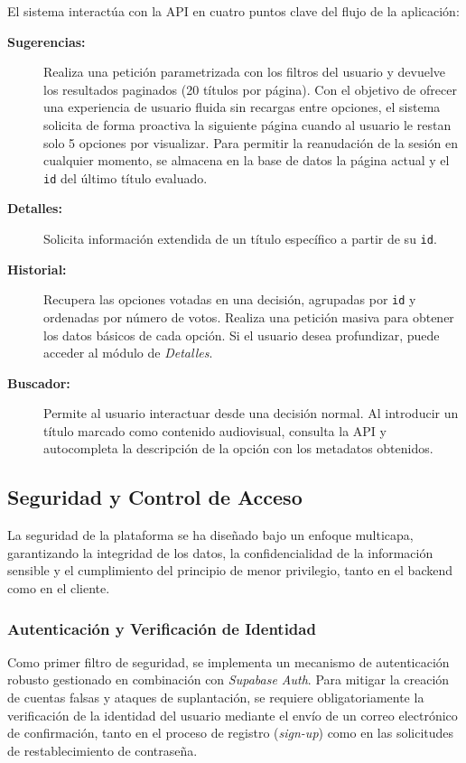 El sistema interactúa con la API en cuatro puntos clave del flujo de la aplicación:

\begin{description}
    \item[\textbf{Sugerencias:}] Realiza una petición parametrizada con los filtros del usuario y devuelve los resultados paginados (20 títulos por página). Con el objetivo de ofrecer una experiencia de usuario fluida sin recargas entre opciones, el sistema solicita de forma proactiva la siguiente página cuando al usuario le restan solo 5 opciones por visualizar. Para permitir la reanudación de la sesión en cualquier momento, se almacena en la base de datos la página actual y el \texttt{id} del último título evaluado.
    \item[\textbf{Detalles:}] Solicita información extendida de un título específico a partir de su \texttt{id}.
    \item[\textbf{Historial:}] Recupera las opciones votadas en una decisión, agrupadas por \texttt{id} y ordenadas por número de votos. Realiza una petición masiva para obtener los datos básicos de cada opción. Si el usuario desea profundizar, puede acceder al módulo de \textit{Detalles}.
    \item[\textbf{Buscador:}] Permite al usuario interactuar desde una decisión normal. Al introducir un título marcado como contenido audiovisual, consulta la API y autocompleta la descripción de la opción con los metadatos obtenidos.
\end{description}


\subsection{Seguridad y Control de Acceso}

La seguridad de la plataforma se ha diseñado bajo un enfoque multicapa, garantizando la integridad de los datos, la confidencialidad de la información sensible y el cumplimiento del principio de menor privilegio, tanto en el backend como en el cliente.

\subsubsection{Autenticación y Verificación de Identidad}
Como primer filtro de seguridad, se implementa un mecanismo de autenticación robusto gestionado en combinación con \textit{Supabase Auth}. Para mitigar la creación de cuentas falsas y ataques de suplantación, se requiere obligatoriamente la verificación de la identidad del usuario mediante el envío de un correo electrónico de confirmación, tanto en el proceso de registro (\textit{sign-up}) como en las solicitudes de restablecimiento de contraseña.

